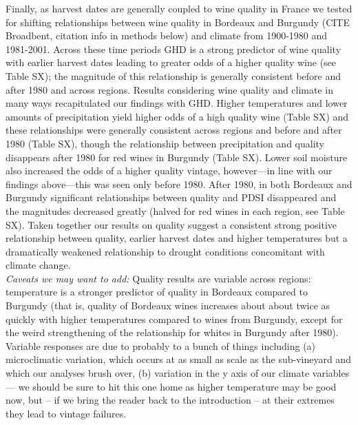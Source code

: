 \documentclass[final]{nature}
\begin{document}
\indent Finally, as harvest dates are generally coupled to wine quality in France we tested for shifting relationships between wine quality in Bordeaux and Burgundy (CITE Broadbent, citation info in methods below) and climate from 1900-1980 and 1981-2001. Across these time periods GHD is a strong predictor of wine quality with earlier harvest dates leading to greater odds of a higher quality wine (see Table SX); the magnitude of this relationship is generally consistent before and after 1980 and across regions. Results considering wine quality and climate in many ways recapitulated our findings with GHD.  Higher temperatures and lower amounts of precipitation yield higher odds of a high quality wine (Table SX) and these relationships were generally consistent across regions and before and after 1980 (Table SX), though the relationship between precipitation and quality disappears after 1980 for red wines in Burgundy (Table SX). Lower soil moisture also increased the odds of a higher quality vintage, however---in line with our findings above---this was seen only before 1980. After 1980, in both Bordeaux and Burgundy significant relationships between quality and PDSI disappeared and the magnitudes decreased greatly (halved for red wines in each region, see Table SX). Taken together our results on quality suggest a consistent strong positive relationship between quality, earlier harvest dates and higher temperatures but a dramatically weakened relationship to drought conditions concomitant with climate change.\\ %

\emph{Caveats we may want to add:} Quality results are variable across regions: temperature is a stronger predictor of quality in Bordeaux compared to Burgundy (that is, quality of Bordeaux wines increases about about twice as quickly with higher temperatures compared to wines from Burgundy, except for the weird strengthening of the relationship for whites in Burgundy after 1980). Variable responses are due to probably to a bunch of things including (a) microclimatic variation, which occurs at as small as scale as the sub-vineyard and which our analyses brush over, (b) variation in the y axis of our climate variables --- we should be sure to hit this one home as higher temperature may be good now, but -- if we bring the reader back to the introduction -- at their extremes they lead to vintage failures.
\end{document}
